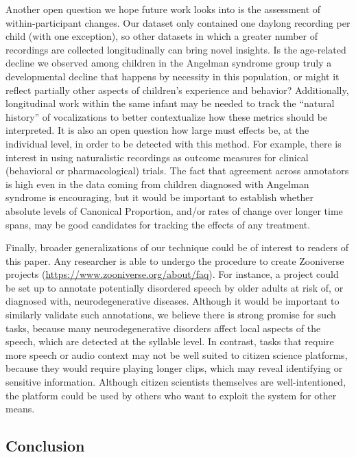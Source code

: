 \documentclass[english,,man,floatsintext]{apa6}
\begin{document}
Another open question we hope future work looks into is the assessment of within-participant changes. Our dataset only contained one daylong recording per child (with one exception), so other datasets in which a greater number of recordings are collected longitudinally can bring novel insights. Is the age-related decline we observed among children in the Angelman syndrome group truly a developmental decline that happens by necessity in this population, or might it reflect partially other aspects of children's experience and behavior? Additionally, longitudinal work within the same infant may be needed to track the \enquote{natural history} of vocalizations to better contextualize how these metrics should be interpreted. It is also an open question how large must effects be, at the individual level, in order to be detected with this method. For example, there is interest in using naturalistic recordings as outcome measures for clinical (behavioral or pharmacological) trials. The fact that agreement across annotators is high even in the data coming from children diagnosed with Angelman syndrome is encouraging, but it would be important to establish whether absolute levels of Canonical Proportion, and/or rates of change over longer time spans, may be good candidates for tracking the effects of any treatment.

Finally, broader generalizations of our technique could be of interest to readers of this paper. Any researcher is able to undergo the procedure to create Zooniverse projects (\url{https://www.zooniverse.org/about/faq}). For instance, a project could be set up to annotate potentially disordered speech by older adults at risk of, or diagnosed with, neurodegenerative diseases. Although it would be important to similarly validate such annotations, we believe there is strong promise for such tasks, because many neurodegenerative disorders affect local aspects of the speech, which are detected at the syllable level. In contrast, tasks that require more speech or audio context may not be well suited to citizen science platforms, because they would require playing longer clips, which may reveal identifying or sensitive information. Although citizen scientists themselves are well-intentioned, the platform could be used by others who want to exploit the system for other means.

\hypertarget{conclusion}{%
\subsection{Conclusion}\label{conclusion}}
\end{document}
